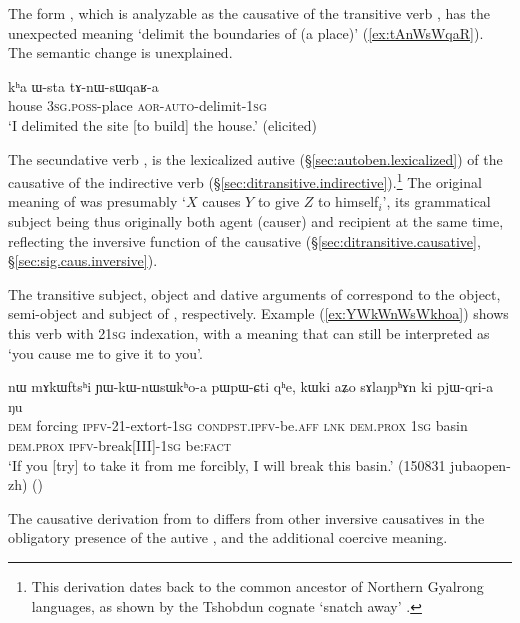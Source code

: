 The form , which is analyzable as the causative of the transitive verb , has the unexpected meaning `delimit the boundaries of (a place)' (\ref{ex:tAnWsWqaR}). The semantic change is unexplained.

\begin{exe} 
\ex \label{ex:tAnWsWqaR}
\gll  kʰa ɯ-sta tɤ-nɯ-sɯqaʁ-a \\
house \textsc{3sg}.\textsc{poss}-place \textsc{aor}-\textsc{auto}-delimit-\textsc{1sg} \\
\glt `I delimited the site [to build] the house.' (elicited)
\end{exe}

The secundative verb , is the lexicalized autive (§\ref{sec:autoben.lexicalized}) of the causative  of the indirective verb  (§\ref{sec:ditransitive.indirective}).\footnote{This derivation dates back to the common ancestor of Northern Gyalrong languages, as shown by the Tshobdun cognate  `snatch away' \citep[220]{jackson19tshobdun}. } The original meaning of  was presumably `$X$ causes $Y$ to give $Z$ to himself$_i$', its grammatical subject being thus originally both agent (causer) and recipient at the same time, reflecting the inversive function of the causative (§\ref{sec:ditransitive.causative}, §\ref{sec:sig.caus.inversive}).

The transitive subject, object and dative arguments of  correspond to the object, semi-object and subject of , respectively. Example (\ref{ex:YWkWnWsWkhoa}) shows this verb with 2\fl{}\textsc{1sg} indexation, with a meaning that can still be interpreted as `you cause me to give it to you'.

\begin{exe}
\ex \label{ex:YWkWnWsWkhoa}
\gll  nɯ mɤkɯftsʰi ɲɯ-kɯ-nɯsɯkʰo-a pɯ\redp{}pɯ-ɕti qʰe, kɯki aʑo sɤlaŋpʰɤn ki pjɯ-qri-a ŋu \\
\textsc{dem} forcing \textsc{ipfv}-2\fl{}1-extort-\textsc{1sg} \textsc{cond}\redp{}\textsc{pst}.\textsc{ipfv}-be.\textsc{aff} \textsc{lnk} \textsc{dem}.\textsc{prox} \textsc{1sg} basin \textsc{dem}.\textsc{prox} \textsc{ipfv}-break[III]-\textsc{1sg} be:\textsc{fact} \\
\glt `If you [try] to take it from me forcibly, I will break this basin.' (150831 jubaopen-zh)
()
\end{exe}

The causative derivation from  to  differs from other inversive causatives in the obligatory presence of the autive , and the additional coercive meaning.

